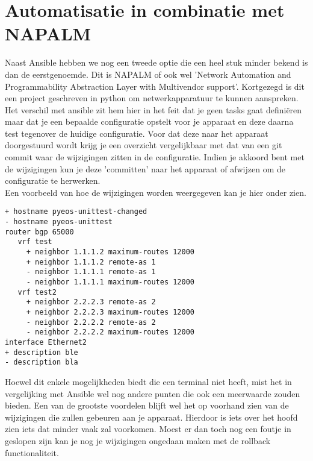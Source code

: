 
\chapter{Automatisatie in combinatie met NAPALM}
\label{ch:napalm}
Naast Ansible hebben we nog een tweede optie die een heel stuk minder bekend is dan de eerstgenoemde. Dit is NAPALM of ook wel 'Network Automation and Programmability Abstraction Layer with Multivendor support'. Kortgezegd is dit een project geschreven in python om netwerkapparatuur te kunnen aanspreken. Het verschil met ansible zit hem hier in het feit dat je geen tasks gaat definiëren maar dat je een bepaalde configuratie opstelt voor je apparaat en deze daarna test tegenover de huidige configuratie. Voor dat deze naar het apparaat doorgestuurd wordt krijg je een overzicht vergelijkbaar met dat van een git commit waar de wijzigingen zitten in de configuratie. Indien je akkoord bent met de wijzigingen kun je deze 'committen' naar het apparaat of afwijzen om de configuratie te herwerken. 
\\

Een voorbeeld van hoe de wijzigingen worden weergegeven kan je hier onder zien.

\begin{center}
\begin{BVerbatim}
+ hostname pyeos-unittest-changed
- hostname pyeos-unittest
router bgp 65000
   vrf test
     + neighbor 1.1.1.2 maximum-routes 12000
     + neighbor 1.1.1.2 remote-as 1
     - neighbor 1.1.1.1 remote-as 1
     - neighbor 1.1.1.1 maximum-routes 12000
   vrf test2
     + neighbor 2.2.2.3 remote-as 2
     + neighbor 2.2.2.3 maximum-routes 12000
     - neighbor 2.2.2.2 remote-as 2
     - neighbor 2.2.2.2 maximum-routes 12000
interface Ethernet2
+ description ble
- description bla
\end{BVerbatim}
\end{center}

Hoewel dit enkele mogelijkheden biedt die een terminal niet heeft, mist het in vergelijking met Ansible wel nog andere punten die ook een meerwaarde zouden bieden. Een van de grootste voordelen blijft wel het op voorhand zien van de wijzigingen die zullen gebeuren aan je apparaat. Hierdoor is iets over het hoofd zien iets dat minder vaak zal voorkomen. Moest er dan toch nog een foutje in geslopen zijn kan je nog je wijzigingen ongedaan maken met de rollback functionaliteit.


